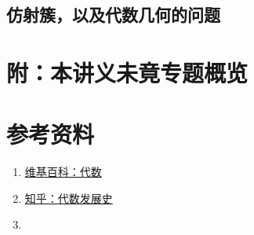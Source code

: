 \subsection{仿射簇，以及代数几何的问题}

\section*{附：本讲义未竟专题概览}

\section*{参考资料}

\begin{enumerate}
    \item \href{https://zh.wikipedia.org/wiki/%E4%BB%A3%E6%95%B0}{维基百科：代数}

    \item \href{https://zhuanlan.zhihu.com/p/574858845}{知乎：代数发展史}

    \item
\end{enumerate}
\begin{summary}

\end{summary}

\begin{exercise}

    \begin{exgroup}
        \item
    \end{exgroup}

    \begin{exgroup}
        \item
    \end{exgroup}

    \begin{exgroup}
        \item
    \end{exgroup}
\end{exercise}
